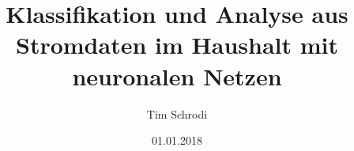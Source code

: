 \documentclass[12pt, a4paper]{report}
\begin{document}
\title{Klassifikation und Analyse aus Stromdaten im Haushalt mit neuronalen
Netzen}
\author{Tim Schrodi}
\date{01.01.2018}
\maketitle

\tableofcontents












\listoffigures
\listofalgorithms
{}

\end{document}
